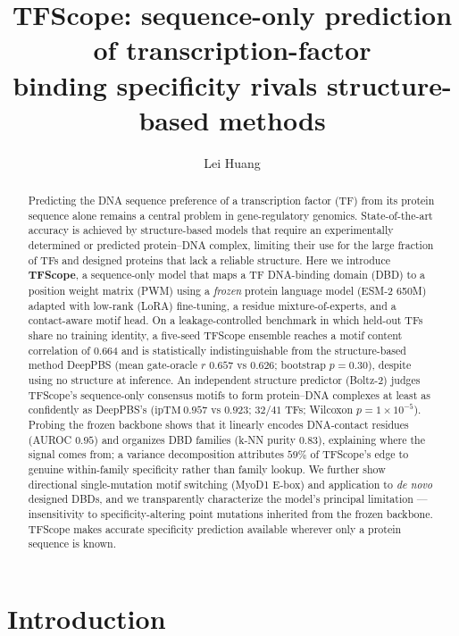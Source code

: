 \documentclass[11pt]{article}
\title{\textbf{TFScope: sequence-only prediction of transcription-factor\\ binding specificity rivals structure-based methods}}
\author[1]{Lei Huang}
\author[1]{\TODO{co-authors}}
\author[1,*]{\TODO{corresponding author}}
\affil[1]{\TODO{affiliations}}
\affil[*]{Correspondence: \TODO{email}}
\date{}
\begin{document}
\maketitle

\begin{abstract}
\noindent
Predicting the DNA sequence preference of a transcription factor (TF) from its
protein sequence alone remains a central problem in gene-regulatory genomics.
State-of-the-art accuracy is achieved by structure-based models that require an
experimentally determined or predicted protein--DNA complex, limiting their use
for the large fraction of TFs and designed proteins that lack a reliable
structure. Here we introduce \textbf{TFScope}, a sequence-only model that maps a
TF DNA-binding domain (DBD) to a position weight matrix (PWM) using a
\emph{frozen} protein language model (ESM-2 650M) adapted with low-rank
(LoRA) fine-tuning, a residue mixture-of-experts, and a contact-aware motif head.
On a leakage-controlled benchmark in which held-out TFs share no training
identity, a five-seed TFScope ensemble reaches a motif content correlation of
$0.664$ and is statistically indistinguishable from the structure-based method
DeepPBS (mean gate-oracle $r$ $0.657$ vs $0.626$; bootstrap $p=0.30$), despite
using no structure at inference. An independent structure predictor (Boltz-2)
judges TFScope's sequence-only consensus motifs to form protein--DNA complexes at
least as confidently as DeepPBS's ($\text{ipTM}\ 0.957$ vs $0.923$; $32/41$ TFs;
Wilcoxon $p=1\times10^{-5}$). Probing the frozen backbone shows that it linearly
encodes DNA-contact residues (AUROC $0.95$) and organizes DBD families
(k-NN purity $0.83$), explaining where the signal comes from; a variance
decomposition attributes $59\%$ of TFScope's edge to genuine within-family
specificity rather than family lookup. We further show directional
single-mutation motif switching (MyoD1 E-box) and application to \emph{de novo}
designed DBDs, and we transparently characterize the model's principal
limitation --- insensitivity to specificity-altering point mutations inherited
from the frozen backbone. TFScope makes accurate specificity prediction available
wherever only a protein sequence is known.
\end{abstract}

\vspace{1em}

\section*{Introduction}
\end{document}
